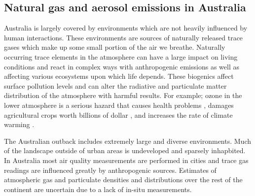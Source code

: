 \subsection{Natural gas and aerosol emissions in Australia}

Australia is largely covered by environments which are not heavily influenced by human interactions.
These environments are sources of naturally released trace gases which make up some small portion of the air we breathe.
Naturally occurring trace elements in the atmosphere can have a large impact on living conditions and react in complex ways with anthropogenic emissions as well as affecting various ecosystems upon which life depends.
These biogenics affect surface pollution levels and can alter the radiative and particulate matter distribution of the atmosphere with harmful results.
For example; ozone in the lower atmosphere is a serious hazard that causes health problems \cite{Hsieh_2013}, damages agricultural crops worth billions of dollar \cite{Avnery_2011}, and increases the rate of climate warming \cite{IPCC_2013_chap8}.

The Australian outback includes extremely large and diverse environments.
Much of the landscape outside of urban areas is undeveloped and sparsely inhapbited.
In Australia most air quality measurements are performed in cities and trace gas readings are influenced greatly by anthropogenic sources.
Estimates of atmospheric gas and particulate densities and distributions over the rest of the continent are uncertain due to a lack of in-situ measurements.
  